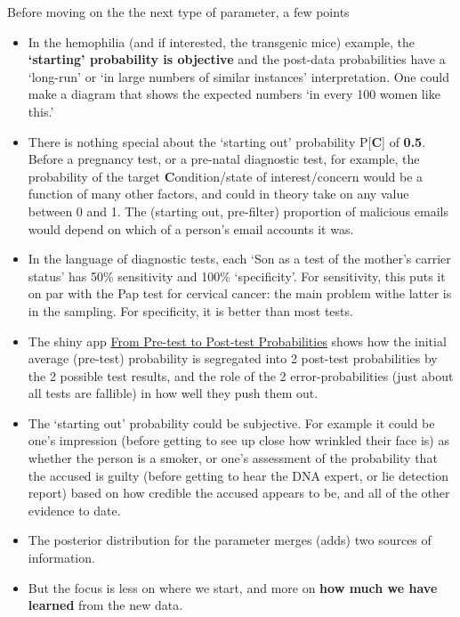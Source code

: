 \documentclass[]{book}
\begin{document}
Before moving on the the next type of parameter, a few points

\begin{itemize}
\item
  In the hemophilia (and if interested, the transgenic mice) example, the \textbf{`starting' probability is objective} and the post-data
  probabilities have a `long-run' or `in large numbers of similar instances' interpretation. One could make a diagram that shows the expected numbers `in every 100 women like this.'
\item
  There is nothing special about the `starting out' probability P{[}\textbf{C}{]} of \textbf{0.5}. Before a pregnancy test, or a pre-natal diagnostic test, for example, the probability of the target \textbf{C}ondition/state of interest/concern would be a function of many other factors, and could in theory take on any value between 0 and 1. The (starting out, pre-filter) proportion of malicious emails would depend on which of a person's email accounts it was.
\item
  In the language of diagnostic tests, each `Son as a test of the mother's carrier status' has 50\% sensitivity and 100\% `specificity'. For sensitivity, this puts it on par with the Pap test for cervical cancer: the main problem withe latter is in the sampling. For specificity, it is better than most tests.
\item
  The shiny app \href{https://jameshanley.shinyapps.io/FromPreTestToPostTestProbabilities/}{From Pre-test to Post-test Probabilities} shows how the initial average (pre-test) probability is segregated into 2 post-test probabilities by the 2 possible test results, and the role of the 2 error-probabilities (just about all tests are fallible) in how well they push them out.
\item
  The `starting out' probability could be subjective. For example it could be one's impression (before getting to see up close how wrinkled their face is) as whether the person is a smoker, or one's assessment of the probability that the accused is guilty (before getting to hear the DNA expert, or lie detection report) based on how credible the accused appears to be, and all of the other evidence to date.
\item
  The posterior distribution for the parameter merges (adds) two sources of information.
\item
  But the focus is less on where we start, and more on \textbf{how much we have learned} from the new data.
\end{itemize}
\end{document}

